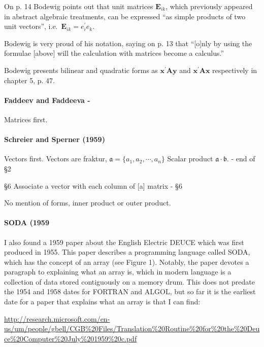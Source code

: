 On p. 14 Bodewig points out that unit matrices $\mathbf E_{ik}$, which previously
appeared in abstract algebraic treatments, can be expressed ``as simple products
of two unit vectors'', i.e.\ $\mathbf E_{ik} = e^\prime_i e_k$.

Bodewig is very proud of his notation, saying on p. 13 that
``[o]nly by using the formulae [above] will the calculation with matrices become a calculus.''

Bodewig presents bilinear and quadratic forms as $\mathbf{x^\prime A y}$ and
$\mathbf{x^\prime A x}$ respectively in chapter 5, p. 47.



\paragraph{Faddeev and Faddeeva - \cite{Faddeev1959}}

Matrices first.



\paragraph{Schreier and Sperner (1959)~\cite{Schreier1959}}

Vectors first.
Vectors are fraktur, $\mathfrak a = \{a_1, a_2, \cdots, a_n\}$
Scalar product $\mathfrak a \cdot \mathfrak b$. - end of \S 2

\S6 Associate a vector with each column of [a] matrix - \S 6

No mention of forms, inner product or outer product.



\paragraph{SODA (1959}

I also found a 1959 paper about the English Electric DEUCE which
was first produced in 1955. This paper describes a programming
language called SODA, which has the concept of an array (see Figure
1). Notably, the paper devotes a paragraph to explaining what an array
is, which in modern language is a collection of data stored
contiguously on a memory drum. This does not predate the 1954 and 1958
dates for FORTRAN and ALGOL, but so far it is the earliest date for a
paper that explains what an array is that I can find:

\url{http://research.microsoft.com/en-us/um/people/gbell/CGB%20Files/Translation%20Routine%20for%20the%20Deuce%20Computer%20July%201959%20c.pdf}




